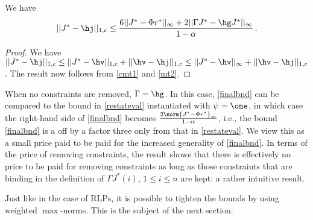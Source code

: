 \begin{corollary}
\label{cmt2}
We have
\begin{align}\label{finalbnd}
||J^*-\hj||_{1,c}\leq\frac{6 ||J^*-\Phi r^*||_\infty+2||\Gamma J^*-\hg J^*||_\infty}{1-\alpha}\,.
\end{align}
\end{corollary}
\begin{proof}
We have
$
||J^*-\hj||_{1,c}\leq||J^*-\hv||_{1,c}+||\hv-\hj||_{1,c}
\leq||J^*-\hv||_\infty+||\hv-\hj||_{1,c}
$.
The result now follows from \cref{cmt1} and \cref{mt2}.
\end{proof}
When no constraints are removed, $\Gamma = \hg$. In this case, \eqref{finalbnd} can be compared to the bound in \cref{restateval} instantiated with $\psi = \one$, in which case the right-hand side of \eqref{finalbnd}
becomes $\frac{2\norm{J^* - \Phi r^*}_{\infty}}{1-\alpha}$, i.e., the bound  \eqref{finalbnd} is a off by a factor three 
only from that in \cref{restateval}.
We view this as a small price paid to be paid for the increased generality of \eqref{finalbnd}.
In terms of the price of removing constraints,
the result shows that there is effectively no price to be paid for removing constraints as long as
those constraints that are binding in the definition of $\Gamma J^*(i)$, $1\le i \le n$ are kept: 
a rather intuitive result.

Just like in the case of RLPs, it is possible to tighten the bounds by using weighted $\max$-norms. 
This is the subject of the next section.




